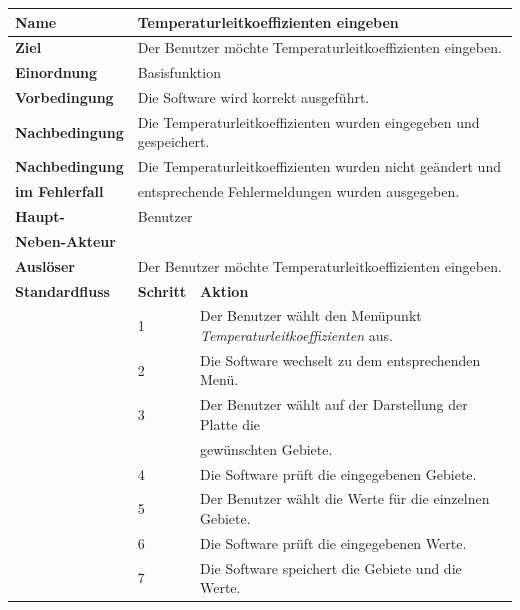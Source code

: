 \begin{table} [H]
	\centering
	\begin{tabular}{|l|l|l|}
		\hline
		\textbf{Name} 			& \multicolumn{2}{|l|}{Temperaturleitkoeffizienten eingeben}  \\
		\hline
		\textbf{Ziel} 			& \multicolumn{2}{|l|}{Der Benutzer möchte Temperaturleitkoeffizienten eingeben. }\\ 
		\hline
		\textbf{Einordnung}		& \multicolumn{2}{|l|}{Basisfunktion}\\
		\hline
		\textbf{Vorbedingung}	& \multicolumn{2}{|l|}{Die Software wird korrekt ausgeführt.} \\
		\hline
		\textbf{Nachbedingung}	& \multicolumn{2}{|l|}{Die Temperaturleitkoeffizienten wurden eingegeben und gespeichert.}\\
		\hline
		\textbf{Nachbedingung} 	& \multicolumn{2}{|l|}{Die Temperaturleitkoeffizienten wurden nicht geändert und}\\
		\textbf{im Fehlerfall}	& \multicolumn{2}{|l|}{entsprechende Fehlermeldungen wurden ausgegeben.}\\
		\hline
		\textbf{Haupt-} 			& \multicolumn{2}{|l|}{Benutzer}\\
		\textbf{Neben-Akteur}	& \multicolumn{2}{|l|}{	}			\\
		\hline
		\textbf{Auslöser} 		& \multicolumn{2}{|l|}{Der Benutzer möchte Temperaturleitkoeffizienten eingeben.} \\
		\hline 
		\textbf{Standardfluss} & \textbf{Schritt} & \textbf{Aktion} \\
		\hline
		&	1	& Der Benutzer wählt den Menüpunkt \emph{Temperaturleitkoeffizienten} aus. \\
		\cline{2-3}
		&	2	& Die Software wechselt zu dem entsprechenden Menü.\\
		\cline{2-3}
		&	3	& Der Benutzer wählt auf der Darstellung der Platte die \\
		&       & gewünschten Gebiete.\\
		\cline{2-3}
		&	4	& Die Software prüft die eingegebenen Gebiete.\\
		\cline{2-3}
		&	5	& Der Benutzer wählt die Werte für die einzelnen Gebiete.\\
		\cline{2-3}
		&	6	& Die Software prüft die eingegebenen Werte.\\
		\cline{2-3}
		&	7	& Die Software speichert die Gebiete und die Werte.\\
		\hline

\end{tabular}
\end{table}
